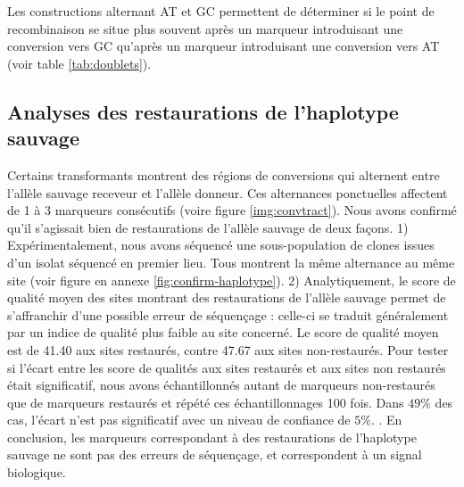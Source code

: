 Les constructions alternant AT et GC permettent de déterminer si le point de
recombinaison se situe plus souvent après un marqueur introduisant une
conversion vers GC qu'après un marqueur introduisant une conversion vers AT
(voir table \ref{tab:doublets}).



\subsection{Analyses des restaurations de l'haplotype sauvage}
\label{subsec:restaur}


Certains transformants montrent des régions de conversions qui alternent entre
l'allèle sauvage receveur et l'allèle donneur. Ces alternances ponctuelles
affectent de 1 à 3 marqueurs consécutifs (voire figure \ref{img:convtract}).
Nous avons confirmé qu'il s'agissait bien de restaurations de l'allèle sauvage
de deux façons. 1) Expérimentalement, nous avons séquencé une sous-population de
clones issues d'un isolat séquencé en premier lieu. Tous montrent la même
alternance au même site (voir figure en annexe \ref{fig:confirm-haplotype}).
2) Analytiquement, le score de qualité moyen des sites montrant des
restaurations de l'allèle sauvage permet de s'affranchir d'une possible erreur
de séquençage : celle-ci se traduit généralement par un indice de qualité plus
faible au site concerné. Le score de qualité moyen est de 41.40 aux sites
restaurés, contre 47.67 aux sites non-restaurés. Pour tester si l'écart entre
les score de qualités aux sites restaurés et aux sites non restaurés était
significatif, nous avons échantillonnés autant de marqueurs non-restaurés que de
marqueurs restaurés et répété ces échantillonnages 100 fois. Dans $49\%$ des
cas, l'écart n'est pas significatif avec un niveau de confiance de $5\%$.
. En conclusion, les marqueurs correspondant à des restaurations de l'haplotype
sauvage ne sont pas des erreurs de séquençage, et correspondent à un signal
biologique.

